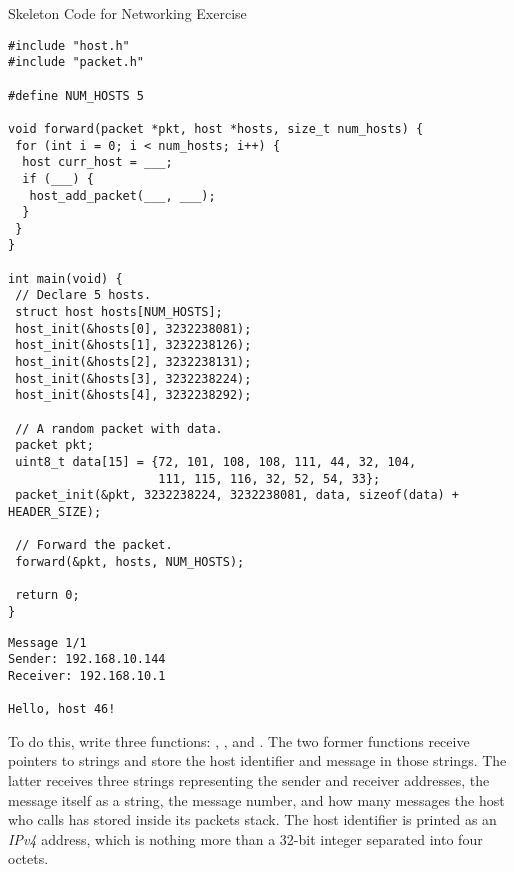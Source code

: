
\begin{cl}[network.c]{Skeleton Code for Networking Exercise}
\begin{lstlisting}[language=MyC]
#include "host.h"
#include "packet.h"

#define NUM_HOSTS 5

void forward(packet *pkt, host *hosts, size_t num_hosts) {
 for (int i = 0; i < num_hosts; i++) {
  host curr_host = ___;
  if (___) {
   host_add_packet(___, ___);
  }
 }
}

int main(void) {
 // Declare 5 hosts.
 struct host hosts[NUM_HOSTS];
 host_init(&hosts[0], 3232238081);
 host_init(&hosts[1], 3232238126);
 host_init(&hosts[2], 3232238131);
 host_init(&hosts[3], 3232238224);
 host_init(&hosts[4], 3232238292);

 // A random packet with data.
 packet pkt;
 uint8_t data[15] = {72, 101, 108, 108, 111, 44, 32, 104, 
                     111, 115, 116, 32, 52, 54, 33};
 packet_init(&pkt, 3232238224, 3232238081, data, sizeof(data) + HEADER_SIZE);

 // Forward the packet.
 forward(&pkt, hosts, NUM_HOSTS);

 return 0;
}
\end{lstlisting}
\end{cl}


\begin{verbatim}
Message 1/1
Sender: 192.168.10.144
Receiver: 192.168.10.1

Hello, host 46!
\end{verbatim}

To do this, write three functions: , , and . The two former functions receive pointers to strings and store the host identifier and message in those strings. The latter receives three strings representing the sender and receiver addresses, the message itself as a string, the message number, and how many messages the host who calls  has stored inside its packets stack. The host identifier is printed as an \textit{IPv4} address, which is nothing more than a 32-bit integer separated into four octets.

